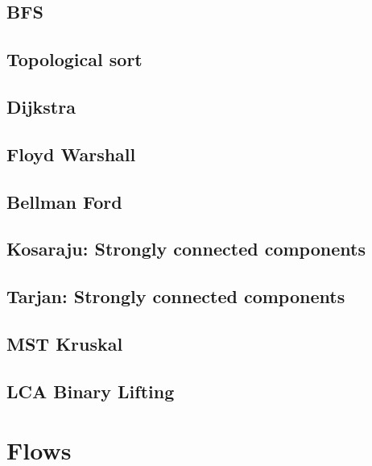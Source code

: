 \subsection{BFS}
\raggedbottom
\hrulefill
\subsection{Topological sort}
\raggedbottom
\hrulefill
\subsection{Dijkstra}
\raggedbottom
\hrulefill
\subsection{Floyd Warshall}
\raggedbottom
\hrulefill
\subsection{Bellman Ford}
\raggedbottom
\hrulefill
\subsection{Kosaraju: Strongly connected components}
\raggedbottom
\hrulefill
\subsection{Tarjan: Strongly connected components}
\raggedbottom
\hrulefill
\subsection{MST Kruskal}
\raggedbottom
\hrulefill
\subsection{LCA Binary Lifting}
\raggedbottom
\hrulefill

\section{Flows}

